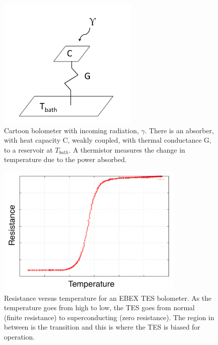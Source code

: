 \begin{figure}[htp]
\begin{center}
\includegraphics[height=2.5in]{figures/bolometer_cartoon}
\caption{Cartoon bolometer with incoming radiation, $\gamma$. There is an absorber, with heat capacity C, weakly coupled, with thermal conductance G, to a reservoir at $T_{bath}$. A thermistor measures the change in temperature due to the power absorbed. \label{fig:bolometer_cartoon} }
\end{center}
\end{figure}

\begin{figure}[htp]
\begin{center}
\includegraphics[height=2.5in]{figures/RvsT_for_thesis.png}
\caption{Resistance versus temperature for an \ac{EBEX} \ac{TES} bolometer. As the temperature goes from high to low, the \ac{TES} goes from normal (finite resistance) to superconducting (zero resistance). The region in between is the transition and this is where the \ac{TES} is biased for operation. 
\label{fig:r_vs_t} }
\end{center}
\end{figure}

